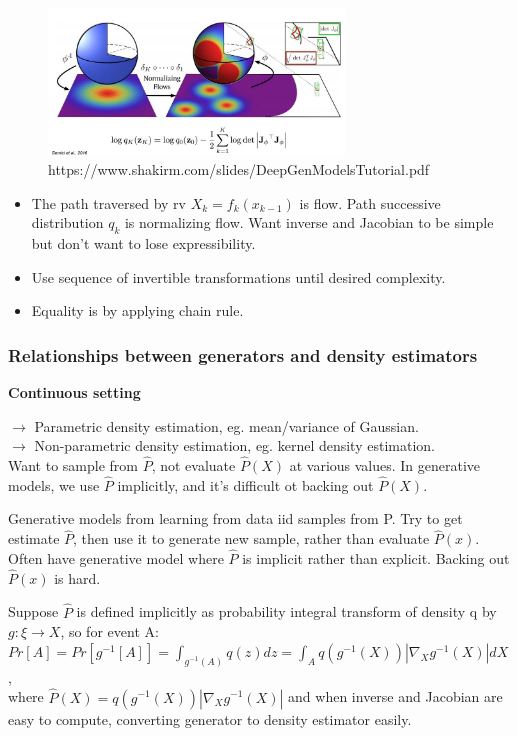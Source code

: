 \documentclass[12pt,a4paper]{article}
\begin{document}
\begin{figure}[!ht]
    \centering
    \includegraphics[width=0.7\textwidth]{fig/norm_flow_eq.jpg}
    \caption{https://www.shakirm.com/slides/DeepGenModelsTutorial.pdf}
\end{figure}

\begin{itemize}
\item The path traversed by rv $X_k=f_k(x_{k-1})$ is flow. Path successive distribution {$q_k$} is normalizing flow. 
Want inverse and Jacobian to be simple but don't want to lose expressibility. 
\item Use sequence of invertible transformations until desired complexity. 
\item Equality is by applying chain rule. 
\end{itemize}

\subsubsection{Relationships between generators and density estimators}
\textbf{Continuous setting}

$\rightarrow$ Parametric density estimation, eg. mean/variance of Gaussian. \\
$\rightarrow$ Non-parametric density estimation, eg. kernel density estimation. \\
Want to sample from $\hat{P}$, not evaluate $\hat{P}(X)$ at various values. 
In generative models, we use $\hat{P}$ implicitly, and it's difficult ot backing out $\hat{P}(X)$.

Generative models from learning from data iid samples from P. Try to get estimate $\hat{P}$, then use it to generate new sample, rather than evaluate $\hat{P}(x)$. Often have generative model where $\hat{P}$ is implicit rather than explicit. Backing out $\hat{P}(x)$ is hard. 

Suppose $\hat{P}$ is defined implicitly as probability integral transform of density q by $g: \xi\rightarrow X$, so for event A: \\
$Pr[A]=Pr[g^{-1}[A]]=\int_{g^{-1}(A)}q(z)dz=\int_A q(g^{-1}(X))|\nabla_Xg^{-1}(X)|dX$, \\
where $\hat{P}(X)=q(g^{-1}(X))|\nabla_Xg^{-1}(X)|$ and when inverse and Jacobian are easy to compute, converting generator to density estimator easily. 
\end{document}
